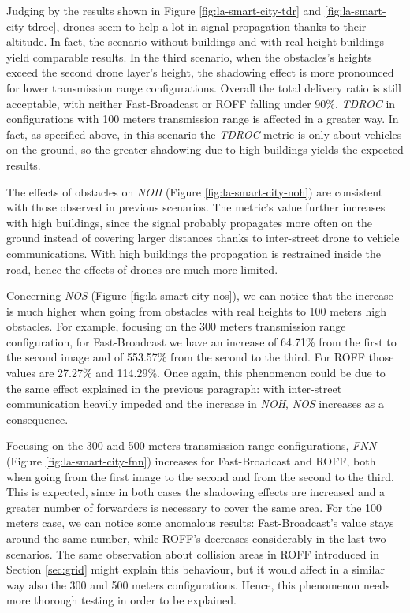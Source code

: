 	Judging by the results shown in Figure \ref{fig:la-smart-city-tdr} and \ref{fig:la-smart-city-tdroc}, drones seem to help a lot in signal propagation thanks to their altitude. In fact, the scenario without buildings and with real-height buildings yield comparable results. In the third scenario, when the obstacles's heights exceed the second drone layer's height, the shadowing effect is more pronounced for lower transmission range configurations. Overall the total delivery ratio is still acceptable, with neither Fast-Broadcast or ROFF falling under 90\%. \textit{TDROC} in configurations with 100 meters transmission range is affected in a greater way. In fact, as specified above, in this scenario the \textit{TDROC} metric is only about vehicles on the ground, so the greater shadowing due to high buildings yields the expected results.
	
	
	The effects of obstacles on \textit{NOH} (Figure \ref{fig:la-smart-city-noh}) are consistent with those observed in previous scenarios. The metric's value further increases with high buildings, since the signal probably propagates more often on the ground instead of covering larger distances thanks to inter-street drone to vehicle communications. With high buildings the propagation is restrained inside the road, hence the effects of drones are much more limited.
	
	
	Concerning \textit{NOS} (Figure \ref{fig:la-smart-city-nos}), we can notice that the increase is much higher when going from obstacles with real heights to 100 meters high obstacles. For example, focusing on the 300 meters transmission range configuration, for Fast-Broadcast we have an increase of 64.71\% from the first to the second image and of 553.57\% from the second to the third. For ROFF those values are 27.27\% and 114.29\%. Once again, this phenomenon could be due to the same effect explained in the previous paragraph: with inter-street communication heavily impeded and the increase in \textit{NOH}, \textit{NOS} increases as a consequence.
	
	
	Focusing on the 300 and 500 meters transmission range configurations, \textit{FNN} (Figure \ref{fig:la-smart-city-fnn}) increases for Fast-Broadcast and ROFF, both when going from the first image to the second and from the second to the third. This is expected, since in both cases the shadowing effects are increased and a greater number of forwarders is necessary to cover the same area. For the 100 meters case, we can notice some anomalous results: Fast-Broadcast's value stays around the same number, while ROFF's decreases considerably in the last two scenarios. The same observation about collision areas in ROFF introduced in Section \ref{sec:grid} might explain this behaviour, but it would affect in a similar way also the 300 and 500 meters configurations. Hence, this phenomenon needs more thorough testing in order to be explained.
	
